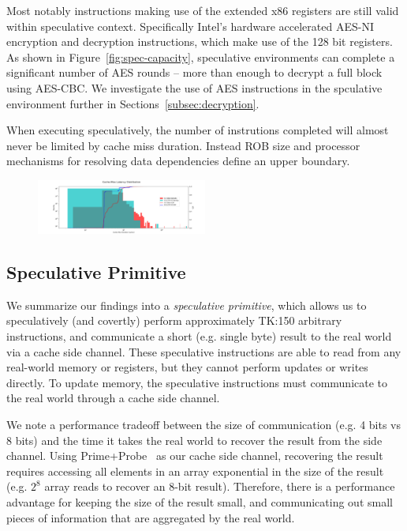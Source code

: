 Most notably instructions making use of the extended x86 registers are still
valid within speculative context. Specifically Intel's hardware accelerated AES-NI
encryption and decryption instructions, which make use of the 128 bit registers.
As shown in Figure~\ref{fig:spec-capacity}, speculative environments can complete
a significant number of AES rounds -- more than enough to decrypt a full block 
using AES-CBC. We investigate the use of AES instructions in the spculative environment
further in Sections~\ref{subsec:decryption}.

\medskip

When executing speculatively, the number of instrutions completed 
will almost never be limited by cache miss duration. Instead
ROB size and processor mechanisms for resolving 
data dependencies define an upper boundary. 



\begin{figure}[h]
    \centering
        \includegraphics[width=0.5\textwidth]{figures/cache_miss_dist}
    \caption{}
    \label{fig:cache-miss}
\end{figure}

\subsection{Speculative Primitive}

We summarize our findings into a \emph{speculative primitive}, which allows us to
speculatively (and covertly) perform approximately TK:150 arbitrary
instructions, and communicate a short (e.g. single byte) result to the real
world via a cache side channel. These speculative instructions are able to read
from any real-world memory or registers, but they cannot perform updates or
writes directly. To update memory, the speculative instructions must communicate
to the real world through a cache side channel.

We note a performance tradeoff between the size of communication (e.g. 4 bits vs 8
bits) and the time it takes the real world to recover the result from the side
channel. Using Prime+Probe~\cite{prime-probe} as our cache side channel,
recovering the result requires accessing all elements in an array exponential in
the size of the result (e.g. $2^8$ array reads to recover an 8-bit result). 
Therefore, there is a
performance advantage for keeping the size of the result small, and communicating
out small pieces of information that are aggregated by the real world.


